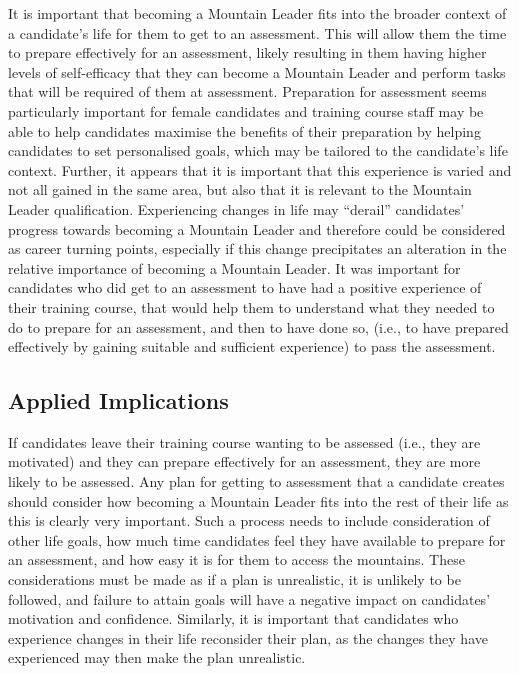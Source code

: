 \documentclass[
  12pt,
  a4paper,
]{book}
\begin{document}
It is important that becoming a Mountain Leader fits into the broader context of a candidate's life for them to get to an assessment. This will allow them the time to prepare effectively for an assessment, likely resulting in them having higher levels of self-efficacy that they can become a Mountain Leader and perform tasks that will be required of them at assessment. Preparation for assessment seems particularly important for female candidates and training course staff may be able to help candidates maximise the benefits of their preparation by helping candidates to set personalised goals, which may be tailored to the candidate's life context. Further, it appears that it is important that this experience is varied and not all gained in the same area, but also that it is relevant to the Mountain Leader qualification. Experiencing changes in life may ``derail'' candidates' progress towards becoming a Mountain Leader and therefore could be considered as career turning points, especially if this change precipitates an alteration in the relative importance of becoming a Mountain Leader. It was important for candidates who did get to an assessment to have had a positive experience of their training course, that would help them to understand what they needed to do to prepare for an assessment, and then to have done so, (i.e., to have prepared effectively by gaining suitable and sufficient experience) to pass the assessment.

\hypertarget{ml-pra-applied-implications}{%
\subsection{Applied Implications}\label{ml-pra-applied-implications}}

If candidates leave their training course wanting to be assessed (i.e., they are motivated) and they can prepare effectively for an assessment, they are more likely to be assessed. Any plan for getting to assessment that a candidate creates should consider how becoming a Mountain Leader fits into the rest of their life as this is clearly very important. Such a process needs to include consideration of other life goals, how much time candidates feel they have available to prepare for an assessment, and how easy it is for them to access the mountains. These considerations must be made as if a plan is unrealistic, it is unlikely to be followed, and failure to attain goals will have a negative impact on candidates' motivation and confidence. Similarly, it is important that candidates who experience changes in their life reconsider their plan, as the changes they have experienced may then make the plan unrealistic.
\end{document}
